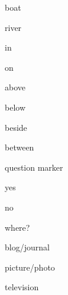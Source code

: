 \documentclass[avery5371,grid,frame]{flashcards}
\begin{document}
\begin{flashcard}{\LARGE boat}
\LARGE {}
\end{flashcard}
\begin{flashcard}{\LARGE river}
\LARGE {}
\end{flashcard}
\begin{flashcard}{\LARGE in}
\LARGE {}
\end{flashcard}
\begin{flashcard}{\LARGE on}
\LARGE {}
\end{flashcard}
\begin{flashcard}{\LARGE above}
\LARGE {}
\end{flashcard}
\begin{flashcard}{\LARGE below}
\LARGE {}
\end{flashcard}
\begin{flashcard}{\LARGE beside}
\LARGE {}
\end{flashcard}
\begin{flashcard}{\LARGE between}
\LARGE {}
\end{flashcard}
\begin{flashcard}{\LARGE question marker}
\LARGE {}
\end{flashcard}
\begin{flashcard}{\LARGE yes}
\LARGE {}
\end{flashcard}
\begin{flashcard}{\LARGE no}
\LARGE {}
\end{flashcard}
\begin{flashcard}{\LARGE where?}
\LARGE {}
\end{flashcard}
\begin{flashcard}{\LARGE blog/journal}
\LARGE {}
\end{flashcard}
\begin{flashcard}{\LARGE picture/photo}
\LARGE {}
\end{flashcard}
\begin{flashcard}{\LARGE television}
\LARGE {}
\end{flashcard}
\end{document}
